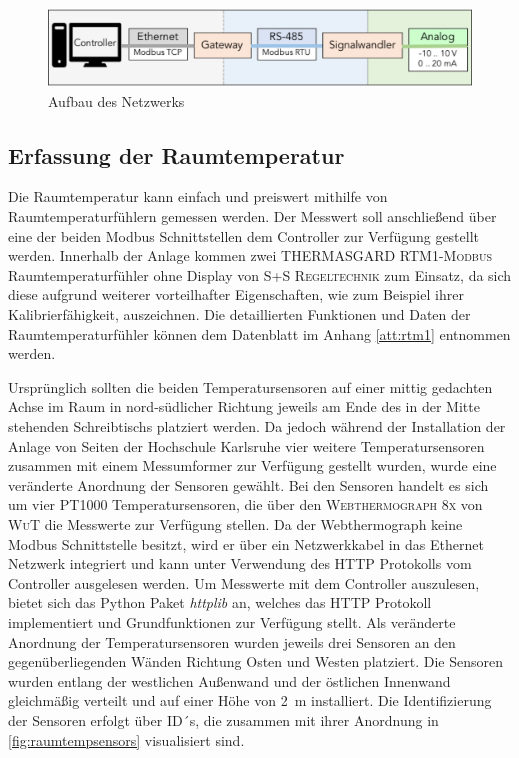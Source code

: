 \begin{figure}
\centering
\includegraphics[width=\textwidth]{abbildungen/20160324_netzwerk}
\caption{Aufbau des Netzwerks}
\label{fig:netzwerk}
\end{figure}

\subsection{Erfassung der Raumtemperatur}

Die Raumtemperatur kann einfach und preiswert mithilfe von Raumtemperaturfühlern gemessen werden. Der Messwert soll anschließend über eine der beiden Modbus Schnittstellen dem Controller zur Verfügung gestellt werden. Innerhalb der Anlage kommen zwei \textsc{THERMASGARD RTM1-Modbus} Raumtemperaturfühler ohne Display von \textsc{S+S Regeltechnik} zum Einsatz, da sich diese aufgrund weiterer vorteilhafter Eigenschaften, wie zum Beispiel ihrer Kalibrierfähigkeit, auszeichnen. Die detaillierten Funktionen und Daten der Raumtemperaturfühler können dem Datenblatt im Anhang \ref{att:rtm1} entnommen werden.

Ursprünglich sollten die beiden Temperatursensoren auf einer mittig gedachten Achse im Raum in nord-südlicher Richtung  jeweils am Ende des in der Mitte stehenden Schreibtischs platziert werden. Da jedoch während der Installation der Anlage von Seiten der Hochschule Karlsruhe vier weitere Temperatursensoren zusammen mit einem Messumformer zur Verfügung gestellt wurden, wurde eine veränderte Anordnung der Sensoren gewählt. 
Bei den Sensoren handelt es sich um vier PT1000 Temperatursensoren, die über den \textsc{Webthermograph 8x} von \textsc{WuT} die Messwerte zur Verfügung stellen. Da der Webthermograph keine Modbus Schnittstelle besitzt, wird er über ein Netzwerkkabel in das Ethernet Netzwerk integriert und kann unter Verwendung des HTTP Protokolls vom Controller ausgelesen werden.
Um Messwerte mit dem Controller auszulesen, bietet sich das Python Paket \textit{httplib} an, welches das HTTP Protokoll implementiert und Grundfunktionen zur Verfügung stellt. 
Als veränderte Anordnung der Temperatursensoren wurden jeweils drei Sensoren an den gegenüberliegenden Wänden Richtung Osten und Westen platziert. Die Sensoren wurden entlang der westlichen Außenwand und der östlichen Innenwand gleichmäßig verteilt und auf einer Höhe von 2~m installiert. Die Identifizierung der Sensoren erfolgt über ID´s, die zusammen mit ihrer Anordnung in \ref{fig:raumtempsensors} visualisiert sind.

